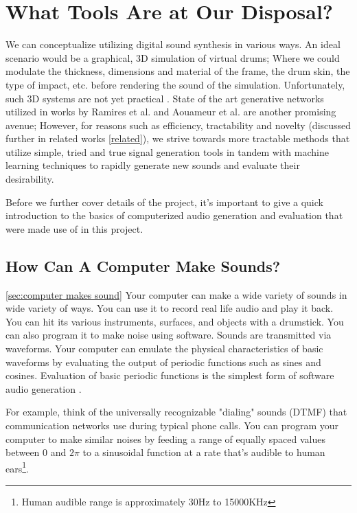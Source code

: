 \documentclass[\main/thesis.tex]{subfiles}
\begin{document}
\section{What Tools Are at Our Disposal?}
\label{sec_tools_disposal}
We can conceptualize utilizing digital sound synthesis in various ways. An ideal scenario would be a graphical, 3D simulation of virtual drums; Where we could modulate the thickness, dimensions and material of the frame, the drum skin, the type of impact, etc. before rendering the sound of the simulation. Unfortunately, such 3D systems are not yet practical \cite{langlois2016toward}. State of the art generative networks utilized in works by Ramires et al. \cite{ramires2020neural} and Aouameur et al.\cite{aouameur2019neural} 
are another promising avenue; However, for reasons such as efficiency, tractability and novelty (discussed further in related works \ref{related}), we strive towards more tractable methods that utilize simple, tried and true signal generation tools in tandem with machine learning techniques to rapidly generate new sounds and evaluate their desirability.

Before we further cover details of the project, it's important to give a quick introduction to the basics of computerized audio generation and evaluation that were made use of in this project.
\subsection{How Can A Computer Make Sounds?}
\ref{sec:computer makes sound}
Your computer can make a wide variety of sounds in wide variety of ways. You can use it to record real life audio and play it back. You can hit its various instruments, surfaces, and objects with a drumstick. You can also program it to make noise using software.
Sounds are transmitted via waveforms. Your computer can emulate the physical characteristics of basic waveforms by evaluating the output of periodic functions such as sines and cosines. Evaluation of basic periodic functions is the simplest form of software audio generation \cite[chapter~5]{mitchell2009basicsynth}.

For example, think of the universally recognizable "dialing" sounds (DTMF) that communication networks use during typical phone calls. You can program your computer to make similar noises by feeding a range of equally spaced values between 0 and $2\pi$ to a sinusoidal function at a rate that's audible to human ears\footnote{Human audible range is approximately 30Hz to 15000KHz}. 
\end{document}
